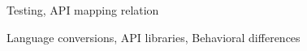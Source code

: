 \documentclass[10pt,preprint]{sigplanconf}
\begin{document}
\terms
Testing, API mapping relation

\keywords
Language conversions, API libraries, Behavioral differences

%
%


%


%
%

\end{document}
